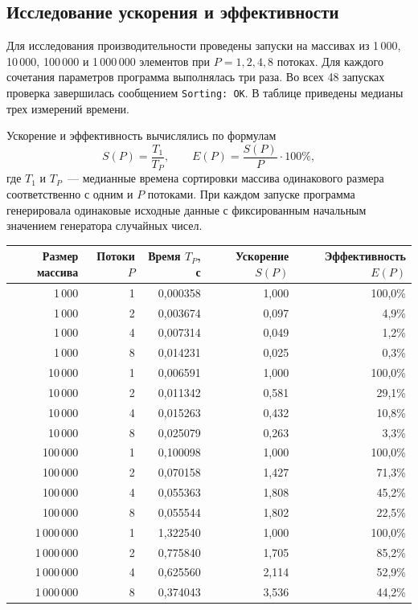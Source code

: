 \documentclass[12pt,a4paper,oneside]{article}
\begin{document}
\subsection{Исследование ускорения и эффективности}
Для исследования производительности проведены запуски на массивах из 1\,000, 10\,000, 100\,000 и 1\,000\,000 элементов при $P=1,2,4,8$ потоках. Для каждого сочетания параметров программа выполнялась три раза. Во всех 48 запусках проверка завершилась сообщением \texttt{Sorting: OK}. В таблице приведены медианы трех измерений времени.

Ускорение и эффективность вычислялись по формулам
\[
S(P)=\frac{T_1}{T_P}, \qquad
E(P)=\frac{S(P)}{P}\cdot100\%,
\]
где $T_1$ и $T_P$~--- медианные времена сортировки массива одинакового размера соответственно с одним и $P$ потоками. При каждом запуске программа генерировала одинаковые исходные данные с фиксированным начальным значением генератора случайных чисел.

\begin{center}
\scriptsize
\setlength{\tabcolsep}{3pt}
\begin{tabular}{|r|r|r|r|r|}
\hline
Размер массива & Потоки $P$ & Время $T_P$, с & Ускорение $S(P)$ & Эффективность $E(P)$ \\ \hline
1\,000 & 1 & 0,000358 & 1,000 & 100,0\% \\ \hline
1\,000 & 2 & 0,003674 & 0,097 & 4,9\% \\ \hline
1\,000 & 4 & 0,007314 & 0,049 & 1,2\% \\ \hline
1\,000 & 8 & 0,014231 & 0,025 & 0,3\% \\ \hline
10\,000 & 1 & 0,006591 & 1,000 & 100,0\% \\ \hline
10\,000 & 2 & 0,011342 & 0,581 & 29,1\% \\ \hline
10\,000 & 4 & 0,015263 & 0,432 & 10,8\% \\ \hline
10\,000 & 8 & 0,025079 & 0,263 & 3,3\% \\ \hline
100\,000 & 1 & 0,100098 & 1,000 & 100,0\% \\ \hline
100\,000 & 2 & 0,070158 & 1,427 & 71,3\% \\ \hline
100\,000 & 4 & 0,055363 & 1,808 & 45,2\% \\ \hline
100\,000 & 8 & 0,055544 & 1,802 & 22,5\% \\ \hline
1\,000\,000 & 1 & 1,322540 & 1,000 & 100,0\% \\ \hline
1\,000\,000 & 2 & 0,775840 & 1,705 & 85,2\% \\ \hline
1\,000\,000 & 4 & 0,625560 & 2,114 & 52,9\% \\ \hline
1\,000\,000 & 8 & 0,374043 & 3,536 & 44,2\% \\ \hline
\end{tabular}
\end{center}
\end{document}

